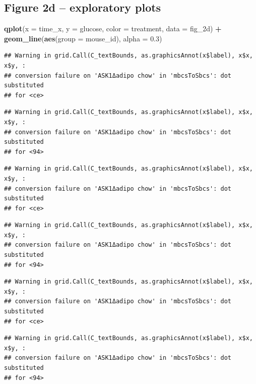 \documentclass[]{book}
\newenvironment{Shaded}{\begin{snugshade}}{\end{snugshade}}
\newcommand{\DataTypeTok}[1]{\textcolor[rgb]{0.13,0.29,0.53}{#1}}
\newcommand{\FloatTok}[1]{\textcolor[rgb]{0.00,0.00,0.81}{#1}}
\newcommand{\KeywordTok}[1]{\textcolor[rgb]{0.13,0.29,0.53}{\textbf{#1}}}
\newcommand{\NormalTok}[1]{#1}
\newcommand{\OperatorTok}[1]{\textcolor[rgb]{0.81,0.36,0.00}{\textbf{#1}}}
\newcommand{\StringTok}[1]{\textcolor[rgb]{0.31,0.60,0.02}{#1}}
\begin{document}
\hypertarget{figure-2d-exploratory-plots}{%
\subsection{Figure 2d -- exploratory plots}\label{figure-2d-exploratory-plots}}

\begin{Shaded}
\begin{Highlighting}[]
\KeywordTok{qplot}\NormalTok{(}\DataTypeTok{x =}\NormalTok{ time_x, }\DataTypeTok{y =}\NormalTok{ glucose, }\DataTypeTok{color =}\NormalTok{ treatment, }\DataTypeTok{data =}\NormalTok{ fig_2d) }\OperatorTok{+}
\StringTok{  }\KeywordTok{geom_line}\NormalTok{(}\KeywordTok{aes}\NormalTok{(}\DataTypeTok{group =}\NormalTok{ mouse_id), }\DataTypeTok{alpha =} \FloatTok{0.3}\NormalTok{)}
\end{Highlighting}
\end{Shaded}

\begin{verbatim}
## Warning in grid.Call(C_textBounds, as.graphicsAnnot(x$label), x$x, x$y, :
## conversion failure on 'ASK1Δadipo chow' in 'mbcsToSbcs': dot substituted
## for <ce>
\end{verbatim}

\begin{verbatim}
## Warning in grid.Call(C_textBounds, as.graphicsAnnot(x$label), x$x, x$y, :
## conversion failure on 'ASK1Δadipo chow' in 'mbcsToSbcs': dot substituted
## for <94>
\end{verbatim}

\begin{verbatim}
## Warning in grid.Call(C_textBounds, as.graphicsAnnot(x$label), x$x, x$y, :
## conversion failure on 'ASK1Δadipo chow' in 'mbcsToSbcs': dot substituted
## for <ce>
\end{verbatim}

\begin{verbatim}
## Warning in grid.Call(C_textBounds, as.graphicsAnnot(x$label), x$x, x$y, :
## conversion failure on 'ASK1Δadipo chow' in 'mbcsToSbcs': dot substituted
## for <94>
\end{verbatim}

\begin{verbatim}
## Warning in grid.Call(C_textBounds, as.graphicsAnnot(x$label), x$x, x$y, :
## conversion failure on 'ASK1Δadipo chow' in 'mbcsToSbcs': dot substituted
## for <ce>
\end{verbatim}

\begin{verbatim}
## Warning in grid.Call(C_textBounds, as.graphicsAnnot(x$label), x$x, x$y, :
## conversion failure on 'ASK1Δadipo chow' in 'mbcsToSbcs': dot substituted
## for <94>
\end{verbatim}
\end{document}
